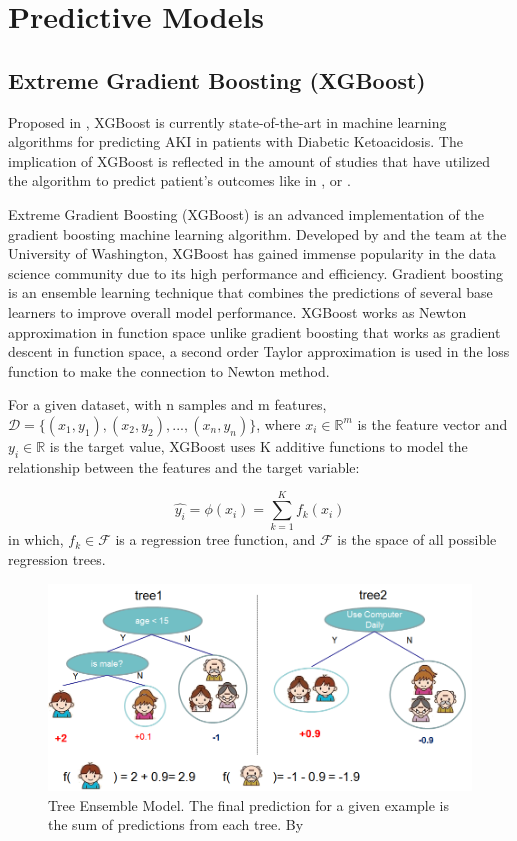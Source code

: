 \documentclass[../main.tex]{subfiles}
\begin{document}
\section{Predictive Models}


\subsection{Extreme Gradient Boosting (XGBoost)}

Proposed in , XGBoost is currently state-of-the-art in machine learning algorithms for predicting \gls{AKI} in patients with Diabetic Ketoacidosis.
The implication of XGBoost is reflected in the amount of studies that have utilized the algorithm to predict patient's outcomes like in ,  or .

Extreme Gradient Boosting (XGBoost) is an advanced implementation of the gradient boosting machine learning algorithm.
Developed by \citeauthor{xgboost-source} and the team at the University of Washington, XGBoost has gained immense popularity in the data science community due to its high performance and efficiency.
Gradient boosting is an ensemble learning technique that combines the predictions of several base learners to improve overall model performance.
XGBoost works as Newton approximation in function space unlike gradient boosting that works as gradient descent in function space, a second order Taylor approximation is used in the loss function to make the connection to Newton method.

For a given dataset, with n samples and m features, $\mathcal{D} = \{(x_1, y_1), (x_2, y_2), ..., (x_n, y_n)\}$, where $x_i \in \mathbb{R}^m$ is the feature vector and $y_i \in \mathbb{R}$ is the target value, XGBoost uses K additive functions to model the relationship between the features and the target variable:

\begin{equation}
    \hat{y_i} = \phi(x_i) = \sum_{k=1}^K f_k(x_i)
\end{equation}
in which, $f_k \in \mathcal{F}$ is a regression tree function, and $\mathcal{F}$ is the space of all possible regression trees.

\begin{figure}
    \centering
    \includegraphics[width=.70\textwidth]{Figure/XGBoost_org_tree_model.png}
    \caption{Tree Ensemble Model. The final prediction for a given example is the sum of  predictions from each tree. By \citeauthor{xgboost-source}}
    \label{fig:treemodel}
\end{figure}
\end{document}
